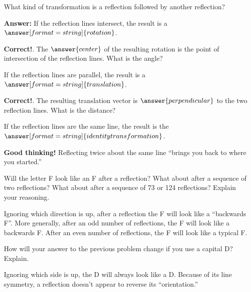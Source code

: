 \documentclass[nooutcomes]{ximera}
\begin{document}
\begin{question}
What kind of transformation is a reflection followed by another reflection?    

\textbf{Answer:} If the reflection lines intersect, the result is a $\answer[format=string]{rotation}$.  
\begin{feedback}[correct]
\textbf{Correct!}. The $\answer{center}$ of the resulting rotation is the point of intersection of the reflection lines.  What is the angle?
\end{feedback}
\begin{question}
If the reflection lines are parallel, the result is a $\answer[format=string]{translation}$. 
\begin{feedback}[correct]
\textbf{Correct!}. The resulting translation vector is $\answer{perpendicular}$ to the two reflection lines. What is the distance?
\end{feedback}
\begin{question}
If the reflection lines are the same line, the result is the $\answer[format=string]{identity transformation}$.
\begin{feedback}[correct]
\textbf{Good thinking!} Reflecting twice about the same line ``brings you back to where you started.'' 
\end{feedback}
\end{question}
\end{question}
\end{question}

\begin{question}
Will the letter F look like an F after a reflection?  What about after a sequence of two reflections?  What about after a sequence of 73 or 124 reflections?  Explain your reasoning.  
\begin{freeResponse}
\begin{hint}
Ignoring which direction is up, after a reflection the F will look like a ``backwards F''.  More generally, after an odd number of reflections, the F will look like a backwards F.  After an even number of reflections, the F will look like a typical F.  
\end{hint}
\end{freeResponse}
\end{question}

\begin{question}
How will your answer to the previous problem change if you use a capital D?  Explain.  
\begin{freeResponse}
\begin{hint}
Ignoring which side is up, the D will always look like a D.  Because of its line symmetry, a reflection doesn't appear to reverse its ``orientation.''  
\end{hint}
\end{freeResponse}
\end{question}
\end{document}
